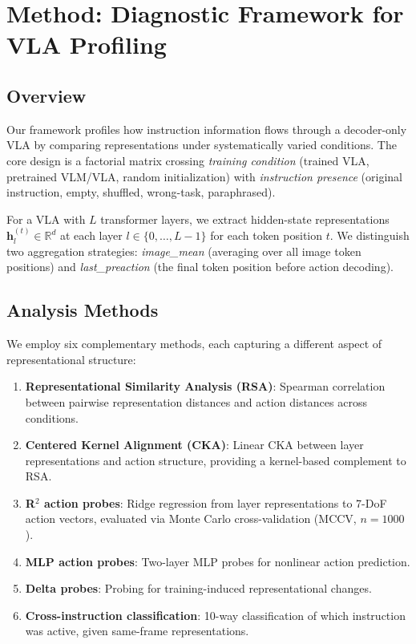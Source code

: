 \documentclass[letterpaper]{article}
\begin{document}
\section{Method: Diagnostic Framework for VLA Profiling}
\label{sec:method}

\subsection{Overview}

Our framework profiles how instruction information flows through a decoder-only VLA by comparing representations under systematically varied conditions. The core design is a factorial matrix crossing \emph{training condition} (trained VLA, pretrained VLM/VLA, random initialization) with \emph{instruction presence} (original instruction, empty, shuffled, wrong-task, paraphrased).

For a VLA with $L$ transformer layers, we extract hidden-state representations $\mathbf{h}_l^{(t)} \in \mathbb{R}^d$ at each layer $l \in \{0, \ldots, L\!-\!1\}$ for each token position $t$. We distinguish two aggregation strategies: \emph{image\_mean} (averaging over all image token positions) and \emph{last\_preaction} (the final token position before action decoding).

\subsection{Analysis Methods}

We employ six complementary methods, each capturing a different aspect of representational structure:

\begin{enumerate}[nosep]
    \item \textbf{Representational Similarity Analysis (RSA)}: Spearman correlation between pairwise representation distances and action distances across conditions.
    \item \textbf{Centered Kernel Alignment (CKA)}: Linear CKA between layer representations and action structure, providing a kernel-based complement to RSA.
    \item \textbf{R$^2$ action probes}: Ridge regression from layer representations to 7-DoF action vectors, evaluated via Monte Carlo cross-validation (MCCV, $n\!=\!1000$).
    \item \textbf{MLP action probes}: Two-layer MLP probes for nonlinear action prediction.
    \item \textbf{Delta probes}: Probing for training-induced representational changes.
    \item \textbf{Cross-instruction classification}: 10-way classification of which instruction was active, given same-frame representations.
\end{enumerate}
\end{document}
